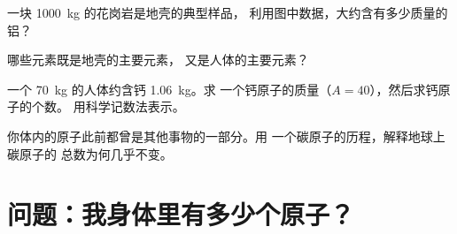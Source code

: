 \begin{exercise}[$\star\star$]\label{exo:g9:elements-universe-earth:9}
一块 \qty{1000}{kg} 的花岗岩是地壳的典型样品，
利用图中数据，大约含有多少质量的铝？
\end{exercise}

\begin{exercise}[$\star\star$]\label{exo:g9:elements-universe-earth:10}
哪些元素既是地壳的主要元素，
又是人体的主要元素？
\end{exercise}

\begin{exercise}[$\star\star\star$]\label{exo:g9:elements-universe-earth:11}
一个 \qty{70}{kg} 的人体约含钙 \qty{1.06}{kg}。求
一个钙原子的质量（$A = 40$），然后求钙原子的个数。
用科学记数法表示。
\end{exercise}

\begin{exercise}[$\star\star\star$]\label{exo:g9:elements-universe-earth:12}
你体内的原子此前都曾是其他事物的一部分。用
一个碳原子的历程，解释地球上碳原子的
总数为何几乎不变。
\end{exercise}

\section{问题：我身体里有多少个原子？}

